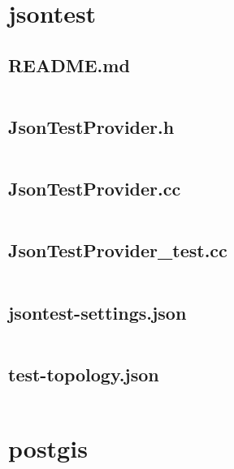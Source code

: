 \documentclass[../main.tex]{subfiles}
\begin{document}
\section{jsontest}

\subsection{README.md}\label{lst:mapprovider-jsontest-readme-md}
\inputminted[breaklines=true]{text}{parts/code/mapprovider/jsontest/README.md}

\subsection{JsonTestProvider.h}\label{lst:mapprovider-jsontest-jsontest-provider-h}
\inputminted[linenos=true]{cpp}{parts/code/mapprovider/jsontest/JsonTestProvider.h}

\subsection{JsonTestProvider.cc}\label{lst:mapprovider-jsontest-jsontest-provider-cc}
\inputminted[linenos=true]{cpp}{parts/code/mapprovider/jsontest/JsonTestProvider.cc}

\subsection{JsonTestProvider\_test.cc}\label{lst:mapprovider-jsontest-jsontest-provider-test-cc}
\inputminted[linenos=true]{cpp}{parts/code/mapprovider/jsontest/catchtest/JsonTestProvider_test.cc}

\subsection{jsontest-settings.json}\label{lst:mapprovider-jsontest-jsontest-settings-json}
\inputminted[linenos=true]{json}{parts/code/mapprovider/jsontest/catchtest/jsontest-settings.json}

\subsection{test-topology.json}\label{lst:mapprovider-jsontest-test-topology-json}
\inputminted[linenos=true]{json}{parts/code/mapprovider/jsontest/catchtest/test-topology.json}

\section{postgis}
\end{document}
